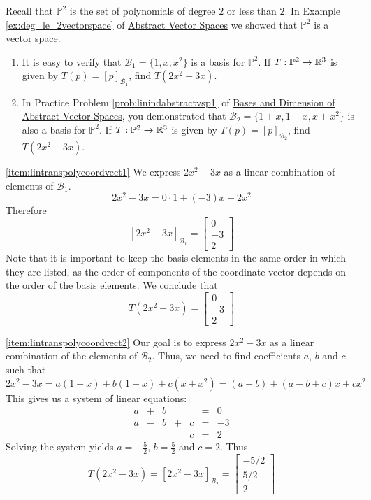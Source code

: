 \documentclass{ximera}
\begin{document}
\begin{example}\label{ex:abstvectsplintranspoly}
Recall that $\mathbb{P}^2$ is the set of polynomials of degree $2$ or less than $2$.  In Example \ref{ex:deg_le_2vectorspace} of \href{https://ximera.osu.edu/oerlinalg/LinearAlgebra/VSP-0050/main}{Abstract Vector Spaces} we showed that $\mathbb{P}^2$ is a vector space. 
\begin{enumerate}
    \item \label{item:lintranspolycoordvect1} It is easy to verify that $\mathcal{B}_1=\{1, x, x^{2}\}$ is a basis for $\mathbb{P}^2$.  If $T:\mathbb{P}^2\rightarrow \mathbb{R}^3$ is given by $T(p)=[p]_{\mathcal{B}_1}$, find $T(2x^2-3x)$.
    \item \label{item:lintranspolycoordvect2}
In Practice Problem \ref{prob:linindabstractvsp1} of \href{https://ximera.osu.edu/oerlinalg/LinearAlgebra/VSP-0060/main}{Bases and Dimension of Abstract Vector Spaces}, you demonstrated that $\mathcal{B}_2=\{1 + x, 1 - x, x + x^{2}\}$ is also a basis for $\mathbb{P}^2$.  If $T:\mathbb{P}^2\rightarrow \mathbb{R}^3$ is given by $T(p)=[p]_{\mathcal{B}_2}$, find $T(2x^2-3x)$.
\end{enumerate}
\begin{explanation}
\ref{item:lintranspolycoordvect1}  We express $2x^2-3x$ as a linear combination of elements of $\mathcal{B}_1$.
$$2x^2-3x=0\cdot 1+ (-3)x+2x^2$$
Therefore $$[2x^2-3x]_{\mathcal{B}_1}=\begin{bmatrix}0\\-3\\2\end{bmatrix}$$
Note that it is important to keep the basis elements in the same order in which they are listed, as the order of components of the coordinate vector depends on the order of the basis elements.  We conclude that
$$T(2x^2-3x)=\begin{bmatrix}0\\-3\\2\end{bmatrix}$$

\ref{item:lintranspolycoordvect2} Our goal is to express $2x^2-3x$ as a linear combination of the elements of $\mathcal{B}_2$.  Thus, we need to find coefficients $a$, $b$ and $c$ such that
$$2x^2-3x=a(1+x)+b(1-x)+c(x+x^2)=(a+b)+(a-b+c)x+cx^2$$
This gives us a system of linear equations:
$$\begin{array}{ccccccc}
      a & +&b&&&= &0 \\
	 a& -&b&+&c&=&-3\\
     & &&&c&=&2
    \end{array}$$
    Solving the system yields $a=-\frac{5}{2}$, $b=\frac{5}{2}$ and $c=2$.  Thus
    $$T(2x^2-3x)=[2x^2-3x]_{\mathcal{B}_2}=\begin{bmatrix}-5/2\\5/2\\2\end{bmatrix}$$
\end{explanation}
\end{example}
\end{document}
